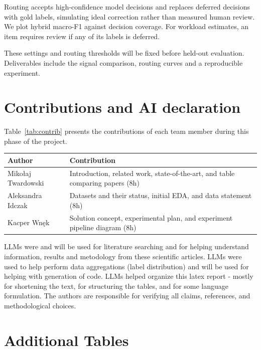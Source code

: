 \documentclass[11pt]{article}
\begin{document}
Routing accepts high-confidence model decisions and replaces
deferred decisions with gold labels, simulating ideal correction
rather than measured human review. We plot hybrid macro-F1 against decision coverage. For workload estimates, an item requires review if any of its labels is deferred.

These settings and routing thresholds will be fixed before
held-out evaluation. Deliverables include the signal comparison,
routing curves and a reproducible experiment.


\section{Contributions and AI declaration}
Table~\ref{tab:contrib} presents the contributions of each team member
during this phase of the project.

\noindent
{\small
\setlength{\tabcolsep}{3pt}
\renewcommand{\arraystretch}{1.12}
\begin{center}
\begin{tabular}{@{}l
  >{\raggedright\arraybackslash}p{}@{}}
\toprule
\textbf{Author} & \textbf{Contribution} \\
\midrule
Mikołaj Twardowski & Introduction, related work, state-of-the-art, and table comparing papers (8h)\\
Aleksandra Idczak & Datasets and their status, initial EDA, and data statement (8h)\\
Kacper Wnęk & Solution concept, experimental plan, and experiment pipeline diagram (8h)\\
\bottomrule
\end{tabular}
\label{tab:contrib}
\end{center}
}


LLMs were and will be used for literature searching and for helping understand information, results and metodology from these scientific articles. LLMs were used to help perform data aggregations (label distribution) and will be used for helping with generation of code. LLMs helped organize this latex report - mostly for shortening the text, for structuring the tables, and for some language formulation.
The authors are responsible for verifying all claims, references, and methodological choices.






\appendix
\onecolumn

\section{Additional Tables}
\end{document}
